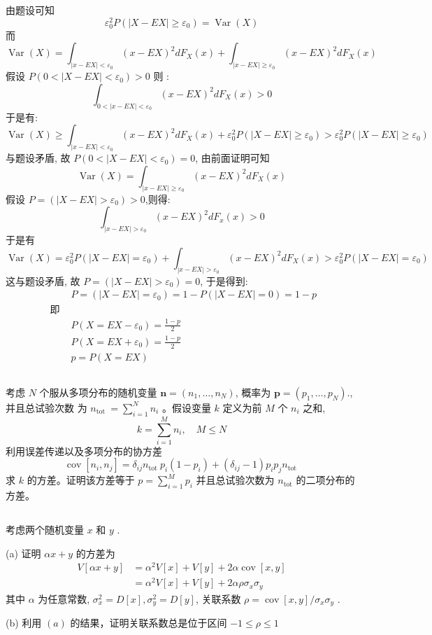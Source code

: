 \documentclass[UTF8,a4paper,10pt]{ctexart}
\begin{document}
由题设可知 
$$\varepsilon_{0}^{2} P\left(|X-E X| \geq \varepsilon_{0}\right)=\operatorname{Var}(X)$$
而
$$\operatorname{Var}(X) = \int_{|x-E X |< \varepsilon_{0}}(x-E X)^{2} d F_{X}(x)+\int_{|x-E X |\geq \varepsilon_{0}}(x-E X)^{2} d F_{X}(x)$$
假设 $P\left(0<| X-E X | <\varepsilon_{0}\right)>0$ 则 :
$$\int_{0<| x-E X|<\varepsilon_{0}}(x-E X)^{2} d F_{X}(x)>0$$ 
于是有:
$$\operatorname{Var}(X) \geq \int_{| x-E X |< \varepsilon_{0}}(x-E X)^{2} d F_{X}(x)+\varepsilon_{0}^{2} P\left(|X-E X |\geq \varepsilon_{0}\right)>\varepsilon_{0}^{2} P\left(|X-E X| \geq \varepsilon_{0}\right)$$
 与题设矛盾, 故 $P\left(0<|X-E X |< \varepsilon_{0}\right)=0$, 由前面证明可知
$$
\operatorname{Var}(X)=\int_{|x-E X| \geq \varepsilon_{0}}(x-E X)^{2} d F_{X}(x)
$$
假设 $P=\left(|X-E X|>\varepsilon_{0}\right)>0$,则得:$$\int_{|x-E X| > \varepsilon_{0}}(x-E X)^{2} d F_{x}(x)>0$$
于是有 
$$
\operatorname{Var}(X)=\varepsilon_{0}^{2} P\left(|X-E X|=\varepsilon_{0}\right)+\int_{|x-E X|>\varepsilon_0}(x-E X)^{2} d F_{X}(x)>\varepsilon_{0}^{2} P\left(|X-E X|=\varepsilon_{0}\right)
$$
这与题设矛盾, 故 $P=\left(|X-E X|>\varepsilon_{0}\right)=0$, 于是得到:
$$
\begin{aligned}
&P=\left(|X-E X|=\varepsilon_{0}\right)=1-P(|X-E X|=0)=1-p \\ \text { 即 } \\
&P\left(X=E X-\varepsilon_{0}\right)=\frac{1-p}{2}\\
&P\left(X=E X+\varepsilon_{0}\right)=\frac{1-p}{2}\\
&p=P(X=E X)
\end{aligned}
$$

\subsection{}
考虑 $N$ 个服从多项分布的随机变量 $\mathbf{n}=\left(n_{1}, \ldots, n_{N}\right)$, 概率为 $\mathbf{p}=\left(p_{1}, \ldots, p_{N}\right).$, 并且总试验次数 为 $n_{\text {tot }}=\sum_{i=1}^{N} n_{i}$ 。假设变量 $k$ 定义为前 $M$ 个 $n_{i}$ 之和,
$$
k=\sum_{i=1}^{M} n_{i}, \quad M \leq N
$$
利用误差传递以及多项分布的协方差
$$
\operatorname{cov}\left[n_{i}, n_{j}\right]=\delta_{i j} n_{\text {tot }} p_{i}\left(1-p_{i}\right)+\left(\delta_{i j}-1\right) p_{i} p_{j} n_{\text {tot }}
$$
求 $k$ 的方差。证明该方差等于 $p=\sum_{i=1}^{M} p_{i}$ 并且总试验次数为 $n_{\mathrm{tot}}$ 的二项分布的方差。

\subsection{}
考虑两个随机变量 $x$ 和 $y$ .


(a) 证明 $\alpha x+y$ 的方差为
$$
\begin{aligned}
V[\alpha x+y] &=\alpha^{2} V[x]+V[y]+2 \alpha \operatorname{cov}[x, y] \\
&=\alpha^{2} V[x]+V[y]+2 \alpha \rho \sigma_{x} \sigma_{y}
\end{aligned}
$$
其中 $\alpha$ 为任意常数, $\sigma_{x}^{2}=D[x], \sigma_{y}^{2}=D[y]$, 关联系数 $\rho=\operatorname{cov}[x, y] / \sigma_{x} \sigma_{y}$ .

(b) 利用 $(a)$ 的结果，证明关联系数总是位于区间 $-1 \leq \rho \leq 1$ 
\end{document}
